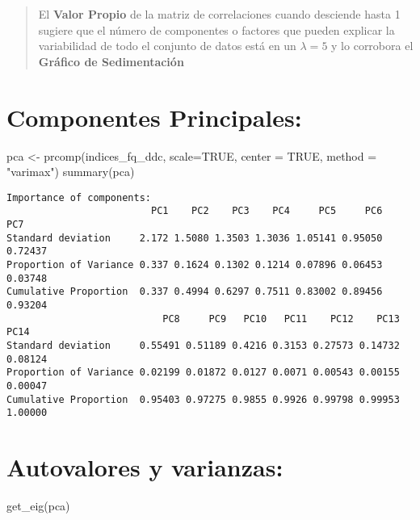 \documentclass[
  10pt,
  letterpaper,
  DIV=11,
  numbers=noendperiod]{scrreprt}
\newenvironment{Shaded}{\begin{snugshade}}{\end{snugshade}}
\newcommand{\AttributeTok}[1]{\textcolor[rgb]{0.40,0.45,0.13}{#1}}
\newcommand{\ConstantTok}[1]{\textcolor[rgb]{0.56,0.35,0.01}{#1}}
\newcommand{\FunctionTok}[1]{\textcolor[rgb]{0.28,0.35,0.67}{#1}}
\newcommand{\NormalTok}[1]{\textcolor[rgb]{0.00,0.23,0.31}{#1}}
\newcommand{\OtherTok}[1]{\textcolor[rgb]{0.00,0.23,0.31}{#1}}
\newcommand{\StringTok}[1]{\textcolor[rgb]{0.13,0.47,0.30}{#1}}
\begin{document}
\begin{quote}
El \textbf{Valor Propio} de la matriz de correlaciones cuando desciende
hasta 1 sugiere que el número de componentes o factores que pueden
explicar la variabilidad de todo el conjunto de datos está en un
\(\lambda=5\) y lo corrobora el \textbf{Gráfico de Sedimentación}
\end{quote}

\hypertarget{componentes-principales}{%
\section{Componentes Principales:}\label{componentes-principales}}

\begin{Shaded}
\begin{Highlighting}[numbers=left,,]
\NormalTok{pca }\OtherTok{\textless{}{-}} \FunctionTok{prcomp}\NormalTok{(indices\_fq\_ddc,}
              \AttributeTok{scale=}\ConstantTok{TRUE}\NormalTok{,}
              \AttributeTok{center =} \ConstantTok{TRUE}\NormalTok{,}
              \AttributeTok{method =} \StringTok{"varimax"}\NormalTok{)}
\FunctionTok{summary}\NormalTok{(pca)}
\end{Highlighting}
\end{Shaded}

\begin{verbatim}
Importance of components:
                         PC1    PC2    PC3    PC4     PC5     PC6     PC7
Standard deviation     2.172 1.5080 1.3503 1.3036 1.05141 0.95050 0.72437
Proportion of Variance 0.337 0.1624 0.1302 0.1214 0.07896 0.06453 0.03748
Cumulative Proportion  0.337 0.4994 0.6297 0.7511 0.83002 0.89456 0.93204
                           PC8     PC9   PC10   PC11    PC12    PC13    PC14
Standard deviation     0.55491 0.51189 0.4216 0.3153 0.27573 0.14732 0.08124
Proportion of Variance 0.02199 0.01872 0.0127 0.0071 0.00543 0.00155 0.00047
Cumulative Proportion  0.95403 0.97275 0.9855 0.9926 0.99798 0.99953 1.00000
\end{verbatim}

\hypertarget{autovalores-y-varianzas}{%
\section{Autovalores y varianzas:}\label{autovalores-y-varianzas}}

\begin{Shaded}
\begin{Highlighting}[numbers=left,,]
\FunctionTok{get\_eig}\NormalTok{(pca)}
\end{Highlighting}
\end{Shaded}
\end{document}
